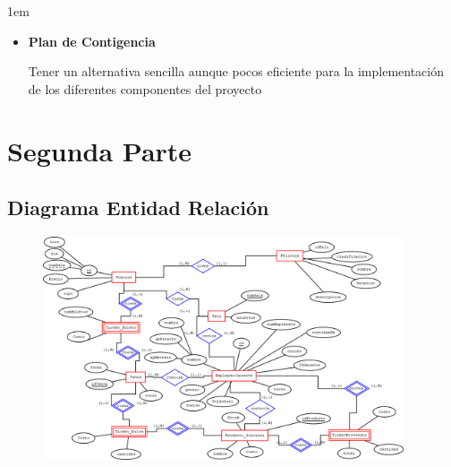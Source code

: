\documentclass[12pt, fleqn]{report}                             %
\newenvironment{SmallIndentation}[1][0.75em]                    %
    {\begin{adjustwidth}{#1}{}\begin{footnotesize}}                 %
    {\end{footnotesize}\end{adjustwidth}}                           %
\begin{document}
\begin{SmallIndentation}[1em]
\begin{itemize}
                        \item
                            \textbf{Plan de Contigencia}

                                Tener un alternativa sencilla aunque pocos 
                                eficiente para la implementación de los 
                                diferentes componentes del proyecto

                    \end{itemize}
                
                \end{SmallIndentation}
                    



\chapter{Segunda Parte}
\clearpage

    \clearpage
    \section{Diagrama Entidad Relación}
        \begin{figure}[h]
            \centering
            \includegraphics[width=0.95\textwidth]{Cine.png}
        \end{figure}
\end{document}
